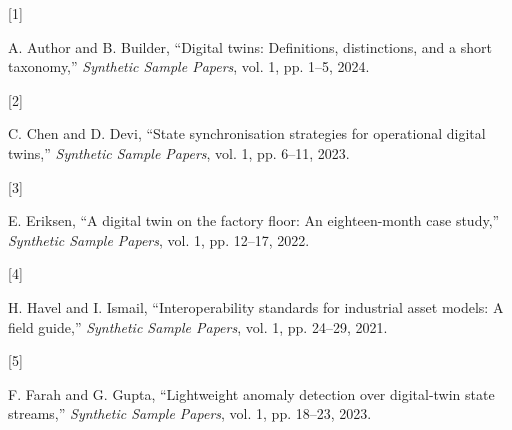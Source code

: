 \documentclass[
  12pt,
  a4paper,
]{article}
\newlength{\cslhangindent}
\newlength{\csllabelwidth}
\newlength{\cslentryspacingunit} %
\newenvironment{CSLReferences}[2] %
 {%
  \setlength{\parindent}{0pt}
  \ifodd #1
  \let\oldpar\par
  \def\par{\hangindent=\cslhangindent\oldpar}
  \fi
  \setlength{\parskip}{#2\cslentryspacingunit}
 }%
 {}
\newcommand{\CSLLeftMargin}[1]{\parbox[t]{\csllabelwidth}{#1}}
\newcommand{\CSLRightInline}[1]{\parbox[t]{\linewidth - \csllabelwidth}{#1}\break}
\begin{document}
\hypertarget{refs}{}
\begin{CSLReferences}{0}{0}
\leavevmode{}%
\CSLLeftMargin{{[}1{]} }%
\CSLRightInline{A. Author and B. Builder, {``Digital twins: Definitions,
distinctions, and a short taxonomy,''} \emph{Synthetic Sample Papers},
vol. 1, pp. 1--5, 2024.}

\leavevmode{}%
\CSLLeftMargin{{[}2{]} }%
\CSLRightInline{C. Chen and D. Devi, {``State synchronisation strategies
for operational digital twins,''} \emph{Synthetic Sample Papers}, vol.
1, pp. 6--11, 2023.}

\leavevmode{}%
\CSLLeftMargin{{[}3{]} }%
\CSLRightInline{E. Eriksen, {``A digital twin on the factory floor: An
eighteen-month case study,''} \emph{Synthetic Sample Papers}, vol. 1,
pp. 12--17, 2022.}

\leavevmode{}%
\CSLLeftMargin{{[}4{]} }%
\CSLRightInline{H. Havel and I. Ismail, {``Interoperability standards
for industrial asset models: A field guide,''} \emph{Synthetic Sample
Papers}, vol. 1, pp. 24--29, 2021.}

\leavevmode{}%
\CSLLeftMargin{{[}5{]} }%
\CSLRightInline{F. Farah and G. Gupta, {``Lightweight anomaly detection
over digital-twin state streams,''} \emph{Synthetic Sample Papers}, vol.
1, pp. 18--23, 2023.}

\end{CSLReferences}
\end{document}
